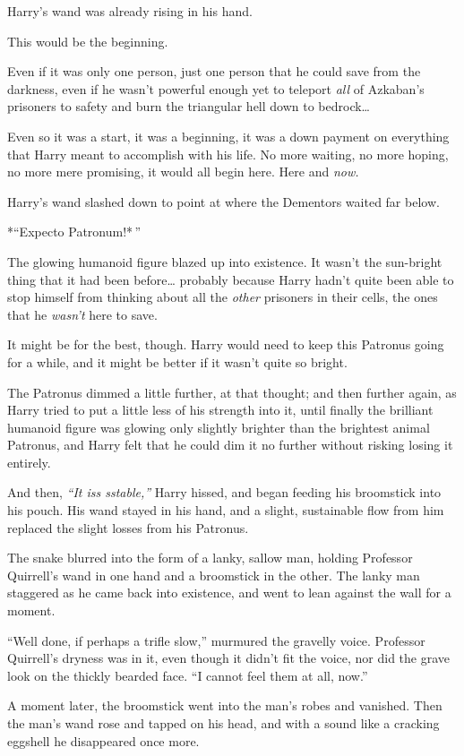 Harry's wand was already rising in his hand.

This would be the beginning.

Even if it was only one person, just one person that he could save from
the darkness, even if he wasn't powerful enough yet to teleport
\emph{all} of Azkaban's prisoners to safety and burn the triangular hell
down to bedrock\ldots{}

Even so it was a start, it was a beginning, it was a down payment on
everything that Harry meant to accomplish with his life. No more
waiting, no more hoping, no more mere promising, it would all begin
here. Here and \emph{now.}

Harry's wand slashed down to point at where the Dementors waited far
below.

*``Expecto Patronum!* ''

The glowing humanoid figure blazed up into existence. It wasn't the
sun-bright thing that it had been before\ldots{} probably because Harry
hadn't quite been able to stop himself from thinking about all the
\emph{other} prisoners in their cells, the ones that he \emph{wasn't}
here to save.

It might be for the best, though. Harry would need to keep this Patronus
going for a while, and it might be better if it wasn't quite so bright.

The Patronus dimmed a little further, at that thought; and then further
again, as Harry tried to put a little less of his strength into it,
until finally the brilliant humanoid figure was glowing only slightly
brighter than the brightest animal Patronus, and Harry felt that he
could dim it no further without risking losing it entirely.

And then, \emph{``It iss sstable,''} Harry hissed, and began feeding his
broomstick into his pouch. His wand stayed in his hand, and a slight,
sustainable flow from him replaced the slight losses from his Patronus.

The snake blurred into the form of a lanky, sallow man, holding
Professor Quirrell's wand in one hand and a broomstick in the other. The
lanky man staggered as he came back into existence, and went to lean
against the wall for a moment.

``Well done, if perhaps a trifle slow,'' murmured the gravelly voice.
Professor Quirrell's dryness was in it, even though it didn't fit the
voice, nor did the grave look on the thickly bearded face. ``I cannot
feel them at all, now.''

A moment later, the broomstick went into the man's robes and vanished.
Then the man's wand rose and tapped on his head, and with a sound like a
cracking eggshell he disappeared once more.

